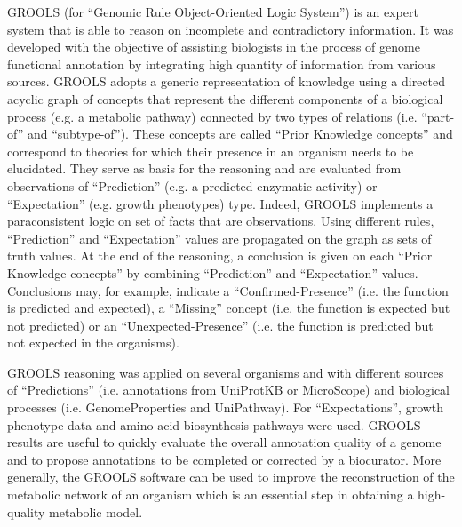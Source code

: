 \documentclass[univ]{thesis}
\begin{document}
\begin{mdframed}[linecolor=psviolet, linewidth=2pt, innerleftmargin=10, innerrightmargin=30, innertopmargin=10, innerbottommargin=50, font=\tiny]
{\begin{multicols}{2}
                GROOLS (for “Genomic Rule Object-Oriented Logic System”) is an expert system that is able to reason on incomplete and contradictory information. It was developed with the objective of assisting biologists in the process of genome functional annotation by integrating high quantity of information from various sources. GROOLS adopts a generic representation of knowledge using a directed acyclic graph of concepts that represent the different components of a biological process (e.g. a metabolic pathway) connected by two types of relations (i.e. “part-of” and “subtype-of”). These concepts are called “Prior Knowledge concepts” and correspond to theories for which their presence in an organism needs to be elucidated. They serve as basis for the reasoning and are evaluated from observations of “Prediction” (e.g. a predicted enzymatic activity) or “Expectation” (e.g. growth phenotypes) type. Indeed, GROOLS implements a paraconsistent logic on set of facts that are observations. Using different rules, “Prediction” and “Expectation” values are propagated on the graph as sets of truth values. At the end of the reasoning, a conclusion is given on each “Prior Knowledge concepts” by combining “Prediction” and “Expectation” values. Conclusions may, for example, indicate a “Confirmed-Presence” (i.e. the function is predicted and expected), a “Missing” concept (i.e. the function is expected but not predicted) or an “Unexpected-Presence” (i.e. the function is predicted but not expected in the organisms).
                
                GROOLS reasoning was applied on several organisms and with different sources of “Predictions” (i.e. annotations from UniProtKB or MicroScope) and biological processes (i.e. GenomeProperties and UniPathway). For “Expectations”, growth phenotype data and amino-acid biosynthesis pathways were used. GROOLS results are useful to quickly evaluate the overall annotation quality of a genome and to propose annotations to be completed or corrected by a biocurator. More generally, the GROOLS software can be used to improve the  reconstruction of the metabolic network of an organism which is an essential step in obtaining a high-quality metabolic model.
            \end{multicols}
        }
    \end{mdframed}
    
\end{document}
